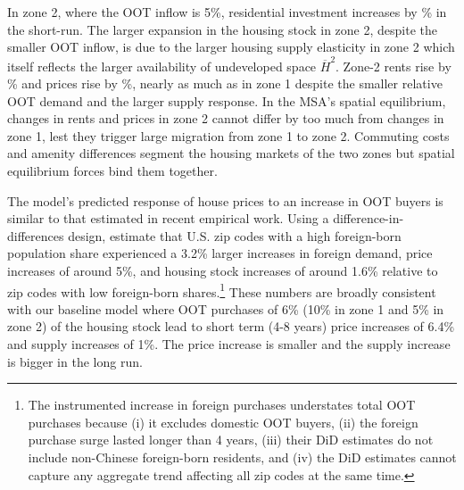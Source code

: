 \documentclass[letterpaper,12pt,dvipsnames,usenames]{article}
\theoremstyle{definition}
\begin{document}
\begin{spacing}{1.25}
In zone 2, where the OOT inflow is 5\%, residential investment increases by {}\% in the short-run. The larger expansion in the housing stock in zone 2, despite the smaller OOT inflow, is due to the larger housing supply elasticity in zone 2 which itself reflects the larger availability of undeveloped space $\overline{H}^2$. Zone-2 rents rise by {}\% and prices rise by {}\%, nearly as much as in zone 1 despite the smaller relative OOT demand and the larger supply response. In the MSA's spatial equilibrium, changes in rents and prices in zone 2 cannot differ by too much from changes in zone 1, lest they trigger large migration from zone 1 to zone 2. Commuting costs and amenity differences segment the housing markets of the two zones but spatial equilibrium forces bind them together.


The model's predicted response of house prices to an increase in OOT buyers is similar to that estimated in recent empirical work. Using a difference-in-differences design, \cite{GorbackKeys2020} estimate that U.S. zip codes with a high foreign-born population share experienced a 3.2\% larger increases in foreign demand, price increases of around 5\%, and housing stock increases of around 1.6\% relative to zip codes with low foreign-born shares.\footnote{The instrumented increase in foreign purchases understates total OOT purchases because (i) it excludes domestic OOT buyers, (ii) the foreign purchase surge lasted longer than 4 years, (iii) their DiD estimates do not include non-Chinese foreign-born residents, and (iv) the DiD estimates cannot capture any aggregate trend affecting all zip codes at the same time.} These numbers are broadly consistent with our baseline model where OOT purchases of 6\% (10\% in zone 1 and 5\% in zone 2) of the housing stock lead to short term (4-8 years) price increases of 6.4\% and supply increases of 1\%. The price increase is smaller and the supply increase is bigger in the long run.


\end{spacing}
\end{document}
